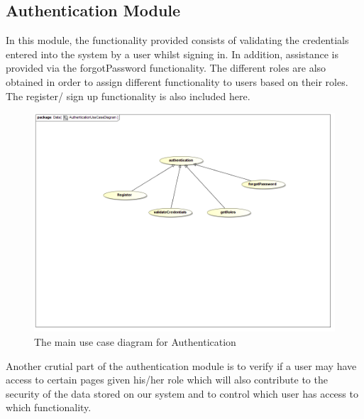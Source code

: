 \documentclass[a4paper,12pt]{article}
\begin{document}
\subsection{Authentication Module}

In this module, the functionality provided consists of validating the credentials entered into the system by a user whilst signing in. In addition, assistance is provided via the forgotPassword functionality. The different roles are also obtained in order to assign different functionality to users based on their roles. The register/ sign up functionality is also included here. 

\begin{figure}[H]
  \centering
    \includegraphics[width=1.0\textwidth]{../images/AuthenticationUseCaseDiagram.png}
    \caption{The main use case diagram for Authentication} 
\end{figure}

Another crutial part of the authentication module is to verify if a user may have access to certain pages given his/her role which will also contribute to the security of the data stored on our system and to control which user has access to which functionality.
\end{document}

